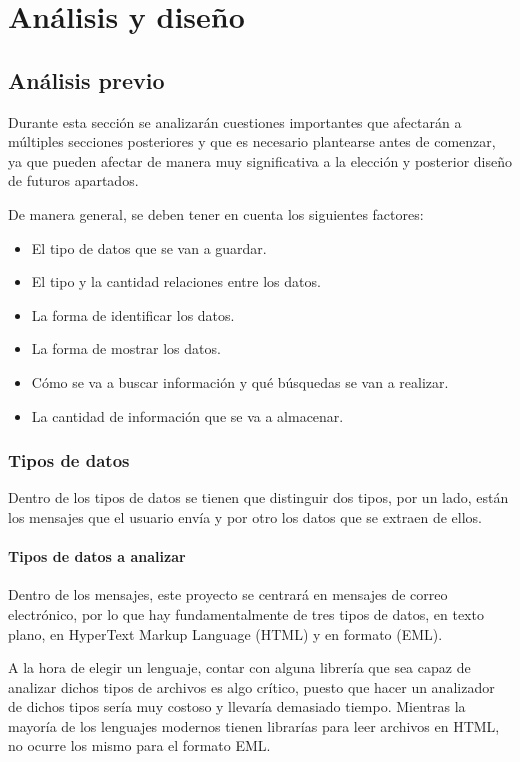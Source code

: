 \chapter{Análisis y diseño}
\section{Análisis previo}
Durante esta sección se analizarán cuestiones importantes que afectarán a múltiples secciones posteriores y que es necesario plantearse antes de comenzar, ya que pueden afectar de manera muy significativa a la elección y posterior diseño de futuros apartados.

De manera general, se deben tener en cuenta los siguientes factores:
\begin{itemize}
    \item El tipo de datos que se van a guardar.
    \item El tipo y la cantidad relaciones entre los datos.
    \item La forma de identificar los datos. 
    \item La forma de mostrar los datos. 
    \item Cómo se va a buscar información y qué búsquedas se van a realizar.
    \item La cantidad de información que se va a almacenar. 
\end{itemize}

\subsection{Tipos de datos}
Dentro de los tipos de datos se tienen que distinguir dos tipos, por un lado, están los mensajes que el usuario envía y por otro los datos que se extraen de ellos. 
\subsubsection{Tipos de datos a analizar}
Dentro de los mensajes, este proyecto se centrará en mensajes de correo electrónico, por lo que hay fundamentalmente de tres tipos de datos, en texto plano, en HyperText Markup Language (HTML) \cite{html_wiki} y en formato (EML).

A la hora de elegir un lenguaje, contar con alguna librería que sea capaz de analizar dichos tipos de archivos es algo crítico, puesto que hacer un analizador de dichos tipos sería muy costoso y llevaría demasiado tiempo. Mientras la mayoría de los lenguajes modernos tienen librarías para leer archivos en HTML, no ocurre los mismo para el formato EML. 

